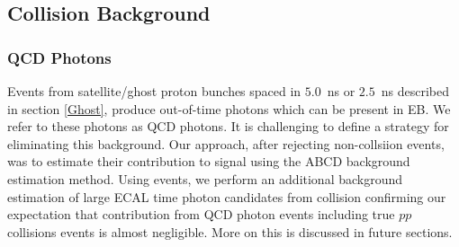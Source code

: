 \subsection{Collision Background}
\subsubsection{QCD Photons}
Events from satellite/ghost proton bunches spaced in $5.0$~ns or $2.5$~ns described in section \ref{Ghost}, produce out-of-time photons which can be present in EB. We refer to these photons as QCD photons. It is challenging to define a strategy for eliminating this background. Our approach, after rejecting non-collsiion events, was to estimate their contribution to signal using the \textsf{ABCD} background estimation method. Using \PZ events, we perform an additional background estimation of large ECAL time photon candidates from collision confirming our expectation that contribution from QCD photon events including true $pp$ collisions events is almost negligible. More on this is discussed in future sections.
